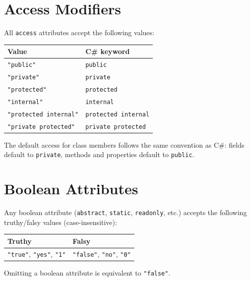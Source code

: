 \documentclass[11pt,a4paper]{article}
\newcommand{\attr}[1]{\texttt{\textcolor{xoop-attr}{#1}}}
\newcommand{\val}[1]{\texttt{\textcolor{xoop-string}{"#1"}}}
\newcommand{\cs}[1]{\texttt{#1}}
\begin{document}
\section{Access Modifiers}

All \attr{access} attributes accept the following values:

\begin{center}
\begin{tabular}{ll}
\toprule
Value & C\# keyword \\
\midrule
\val{public}            & \cs{public} \\
\val{private}           & \cs{private} \\
\val{protected}         & \cs{protected} \\
\val{internal}          & \cs{internal} \\
\val{protected internal}& \cs{protected internal} \\
\val{private protected} & \cs{private protected} \\
\bottomrule
\end{tabular}
\end{center}

The default access for class members follows the same convention as C\#:
fields default to \cs{private}, methods and properties default to \cs{public}.

\section{Boolean Attributes}

Any boolean attribute (\attr{abstract}, \attr{static}, \attr{readonly}, etc.)
accepts the following truthy/falsy values (case-insensitive):

\begin{center}
\begin{tabular}{ll}
\toprule
Truthy & Falsy \\
\midrule
\val{true}, \val{yes}, \val{1} & \val{false}, \val{no}, \val{0} \\
\bottomrule
\end{tabular}
\end{center}

Omitting a boolean attribute is equivalent to \val{false}.

\end{document}
